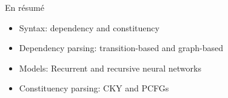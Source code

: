 \documentclass[
	hyperref={unicode},
	xcolor={svgnames, table},
	aspectratio=169,
	french,
]{beamer}
\begin{document}
\begin{frame}{En résumé}
	\begin{block}{}
		\begin{itemize}
			\item Syntax: dependency and constituency
			\item Dependency parsing: transition-based and graph-based
			\item Models: Recurrent and recursive neural networks
			\item Constituency parsing: CKY and PCFGs
		\end{itemize}
	\end{block}
\end{frame}


\end{document}
